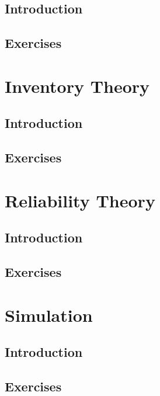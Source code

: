 \documentclass[10pt, twocolumn]{book}
\begin{document}
	\chapter{Introduction}

	\chapter{Exercises}

\part{Inventory Theory}
	\chapter{Introduction}

	\chapter{Exercises}

\part{Reliability Theory}
	\chapter{Introduction}

	\chapter{Exercises}

\part{Simulation}
	\chapter{Introduction}

	\chapter{Exercises}
\end{document}
